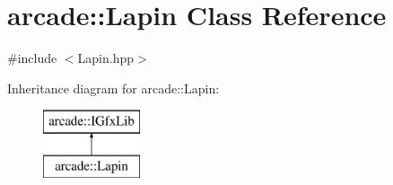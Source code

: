\hypertarget{classarcade_1_1_lapin}{\section{arcade\-:\-:Lapin Class Reference}
\label{classarcade_1_1_lapin}
}


{\ttfamily \#include $<$Lapin.\-hpp$>$}

Inheritance diagram for arcade\-:\-:Lapin\-:\begin{figure}[H]
\begin{center}
\leavevmode
\includegraphics[height=2.000000cm]{classarcade_1_1_lapin}
\end{center}
\end{figure}
